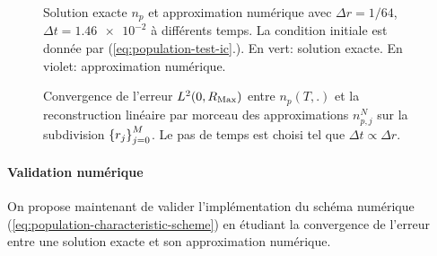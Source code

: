 \begin{figure}[h]
  \begin{center}
    
    
    
    
    
    
  \end{center}
  \begin{center}
    \caption{Solution exacte $n_p$ et approximation numérique avec
      $\Delta r = 1/64$, $\Delta t = \num{1.46e-2}$ à différents
      temps. La condition initiale est donnée par
      (\ref{eq:population-test-ic}.). En vert: solution exacte. En
      violet: approximation numérique.}
    \label{fig:population-timelapse}
  \end{center}
\end{figure}

\begin{figure}[h!]
  \begin{center}
    
    \caption{Convergence de l'erreur $L^2(0, R_\mathrm{Max})$ entre $n_p(T, .)$
      et la reconstruction linéaire par morceau des approximations
      $n_{p,j}^N$ sur la subdivision $\left\{ r_j \right\}_{j = 0}^M$. Le pas
      de temps est choisi tel que $\Delta t \propto \Delta r$.}
    \label{fig:population-convergence}
  \end{center}
\end{figure}
\paragraph{Validation numérique} On propose maintenant de valider
l'implémentation du schéma numérique
(\ref{eq:population-characteristic-scheme}) en étudiant la
convergence de l'erreur entre une solution exacte et son approximation
numérique.

